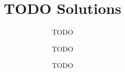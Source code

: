 \documentclass[11pt]{scrartcl}
\begin{document}
\title{TODO Solutions}
\subtitle{TODO}
\author{TODO}
\date{TODO}
\maketitle

\tableofcontents

\cleardoublepage



\newpage


\end{document}
